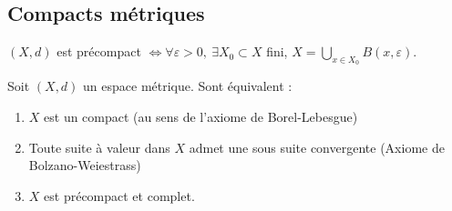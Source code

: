 \subsection{Compacts métriques}
\begin{definition}
    $(X,d)$ est précompact $\Leftrightarrow \forall \varepsilon >0,\ \exists X_0\subset X $ fini, $X=\bigcup\limits_{x\in X_0} B(x,\varepsilon ).$
\end{definition}
\begin{theoreme}
    Soit $(X,d)$ un espace métrique. Sont équivalent :
    \begin{enumerate}
        \item $X$ est un compact (au sens de l'axiome de Borel-Lebesgue)
        \item Toute suite à valeur dans $X$ admet une sous suite convergente (Axiome de Bolzano-Weiestrass)
        \item $X$ est précompact et complet.
    \end{enumerate}
\end{theoreme}
